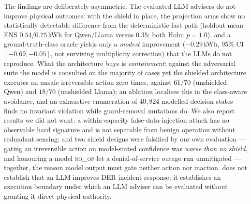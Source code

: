 The findings are deliberately asymmetric. The evaluated LLM advisers do not
improve physical outcomes: with the shield in place, the projection arms show no
statistically detectable difference from the deterministic fast path (holdout
mean ENS $0.54$/$0.75$\,kWh for Qwen/Llama versus $0.35$; both Holm $p=1.0$), and
a ground-truth-class oracle yields only a \emph{modest} improvement
($-0.29$\,kWh, 95\% CI $[-0.69,-0.05]$, not surviving multiplicity correction)
that the LLMs do not reproduce. What the architecture buys is \emph{containment}:
against the adversarial suite the model is consulted on the majority of cases yet
the shielded architecture executes an unsafe irreversible action zero times,
against $61/70$ (unshielded Qwen) and $18/70$ (unshielded Llama); an ablation
localises this in the class-aware avoidance, and an exhaustive enumeration of
$40{,}824$ modelled decision states finds no invariant violation while
guard-removal mutations do. We also report results we did not want: a
within-capacity false-data-injection attack has no observable hard signature and
is not separable from benign operation without redundant sensing; and two shield
designs were falsified by our own evaluation --- gating an irreversible action on
model-stated confidence was \emph{worse than no shield}, and honouring a model
\textsc{no\_op} let a denial-of-service outage run unmitigated --- together, the
reason model output must gate neither action nor inaction.
\ours{} does not establish that an LLM improves DER incident response; it
establishes an execution boundary under which an LLM adviser can be evaluated
without granting it direct physical authority.

